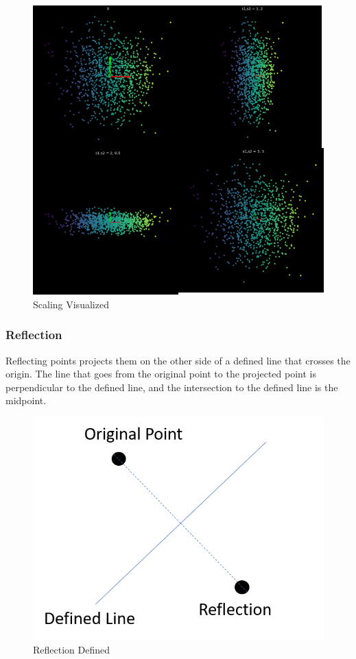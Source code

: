 \begin{figure}[h!]
\begin{center}
\includegraphics{labs/01/images/Scaling.png}
\caption{Scaling Visualized}
\label{fig:mon}
\end{center} 
\end{figure}


\subsubsection{Reflection}
Reflecting points projects them on the other side of a defined line that crosses the origin. 
The line that goes from the original point to the projected point is perpendicular to the defined line, and the intersection to the defined line is the midpoint.


\begin{figure}[h!]
\begin{center}
\includegraphics{labs/01/images/reflection_example.png}
\end{center} 
\caption{Reflection Defined}
\label{fig:mon}
\end{figure}


